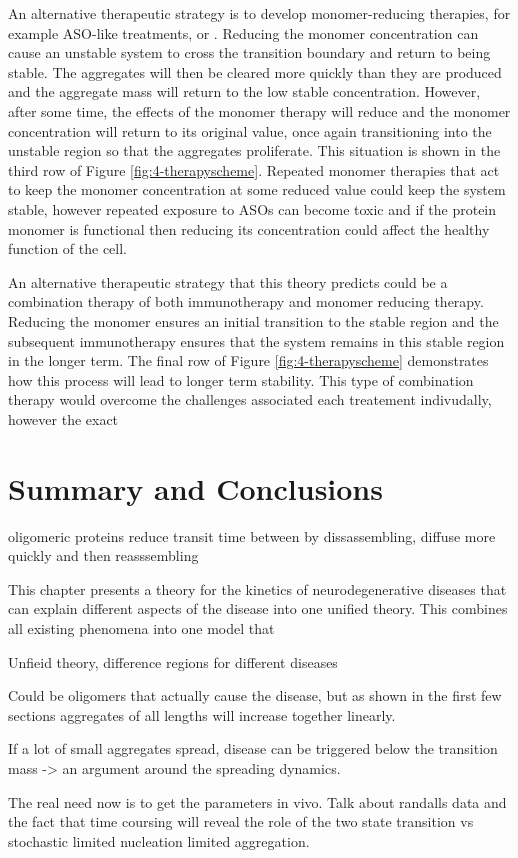 An alternative therapeutic strategy is to develop monomer-reducing therapies, for example ASO-like treatments, or . Reducing the monomer concentration can cause an unstable system to cross the transition boundary and return to being stable. The aggregates will then be cleared more quickly than they are produced and the aggregate mass will return to the low stable concentration. However, after some time, the effects of the monomer therapy will reduce and the monomer concentration will return to its original value, once again transitioning into the unstable region so that the aggregates proliferate. This situation is shown in the third row of Figure \ref{fig:4-therapyscheme}. Repeated monomer therapies that act to keep the monomer concentration at some reduced value could keep the system stable, however repeated exposure to ASOs can become toxic  and if the protein monomer is functional then reducing its concentration could affect the healthy function of the cell.

An alternative therapeutic strategy that this theory predicts could be a combination therapy of both immunotherapy and monomer reducing therapy. Reducing the monomer ensures an initial transition to the stable region and the subsequent immunotherapy ensures that the system remains in this stable region in the longer term. The final row of Figure \ref{fig:4-therapyscheme} demonstrates how this process will lead to longer term stability. This type of combination therapy would overcome the challenges associated each treatement indivudally, however the exact 

\section{Summary and Conclusions}


oligomeric proteins reduce transit time between by dissassembling, diffuse more quickly and then reasssembling \cite{agudo-canalejo_cooperatively_2020}

This chapter presents a theory for the kinetics of neurodegenerative diseases that can explain different aspects of the disease into one unified theory. This combines all existing phenomena into one model that 

Unfieid theory, difference regions for different diseases

Could be oligomers that actually cause the disease, but as shown in the first few sections aggregates of all lengths will increase together linearly.

If a lot of small aggregates spread, disease can be triggered below the transition mass -> an argument around the spreading dynamics.

The real need now is to get the parameters in vivo. Talk about randalls data and the fact that time coursing will reveal the role of the two state transition vs stochastic limited nucleation limited aggregation.